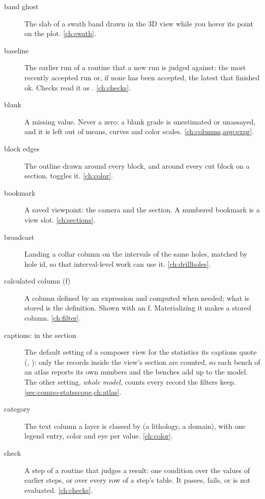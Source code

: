 \begin{description}
\item[band ghost] The slab of a swath band drawn in the 3D view while you hover its point on the
  plot. \cref{ch:swath}.

\item[baseline] The earlier run of a routine that a new run is judged against: the most recently
  accepted run or, if none has been accepted, the latest that finished ok. Checks read it as
  . \cref{ch:checks}.

\item[blank] A missing value. Never a zero: a blank grade is unestimated or unassayed, and it is
  left out of means, curves and color scales. \cref{ch:columns,app:expr}.

\item[block edges] The outline drawn around every block, and around every cut block on a section.
   toggles it. \cref{ch:color}.

\item[bookmark] A saved viewpoint: the camera and the section. A numbered bookmark is a view
  slot. \cref{ch:sections}.

\item[broadcast] Landing a collar column on the intervals of the same holes, matched by hole id, so
  that interval-level work can use it. \cref{ch:drillholes}.

\item[calculated column (ƒ)] A column defined by an expression and computed when needed; what is
  stored is the definition. Shown with an ƒ. Materializing it makes a stored column.
  \cref{ch:filter}.

\item[captions: in the section] The default setting of a composer view for the statistics its
  captions quote (, ): only the records inside the view's section
  are counted, so each bench of an atlas reports its own numbers and the benches add up to the
  model. The other setting, \emph{whole model}, counts every record the filters keep.
  \cref{sec:compo-statsscope,ch:atlas}.

\item[category] The text column a layer is classed by (a lithology, a domain), with one legend
  entry, color and eye per value. \cref{ch:color}.

\item[check] A step of a routine that judges a result: one condition over the values of earlier
  steps, or over every row of a step's table. It passes, fails, or is not evaluated.
  \cref{ch:checks}.


\end{description}
